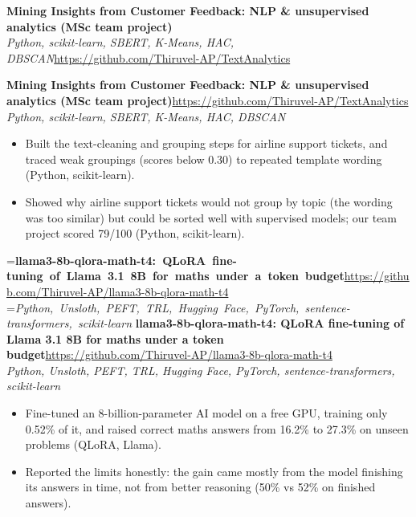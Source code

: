 \documentclass[a4paper,11pt]{article}
\newcommand{\project}[3]{%
  \textbf{#1}\hfill#3\\ {\color{muted}\small\textit{#2}}\par}
\newcommand{\gap}{\vspace{5pt}}
\begin{document}
\else
\textbf{Mining Insights from Customer Feedback: NLP \& unsupervised analytics (MSc team project)}\\ {\color{muted}\small\textit{Python, scikit-learn, SBERT, K-Means, HAC, DBSCAN}}\hfill{\small\url{https://github.com/Thiruvel-AP/TextAnalytics}}\par
\fi
\else
\project{Mining Insights from Customer Feedback: NLP \& unsupervised analytics (MSc team project)}{Python, scikit-learn, SBERT, K-Means, HAC, DBSCAN}{\url{https://github.com/Thiruvel-AP/TextAnalytics}}
\fi
\begin{itemize}
  \item Built the text-cleaning and grouping steps for airline support tickets, and traced weak groupings (scores below 0.30) to repeated template wording (Python, scikit-learn).
  \item Showed why airline support tickets would not group by topic (the wording was too similar) but could be sorted well with supervised models; our team project scored 79/100 (Python, scikit-learn).
\end{itemize}
\gap
{}
=\hbox{\textbf{llama3-8b-qlora-math-t4: QLoRA fine-tuning of Llama 3.1 8B for maths under a token budget}\hspace{1em}\url{https://github.com/Thiruvel-AP/llama3-8b-qlora-math-t4}}%
=\hbox{{\small\textit{Python, Unsloth, PEFT, TRL, Hugging Face, PyTorch, sentence-transformers, scikit-learn}}}%
\ifdim\wd0>\linewidth
\ifdim\wd2>\linewidth
\textbf{llama3-8b-qlora-math-t4: QLoRA fine-tuning of Llama 3.1 8B for maths under a token budget}\\ {\color{muted}\small\textit{Python, Unsloth, PEFT, TRL, Hugging Face, PyTorch, sentence-transformers, scikit-learn}}\\ \hspace*{\fill}{\small\url{https://github.com/Thiruvel-AP/llama3-8b-qlora-math-t4}}\par
\else
\textbf{llama3-8b-qlora-math-t4: QLoRA fine-tuning of Llama 3.1 8B for maths under a token budget}\\ {\color{muted}\small\textit{Python, Unsloth, PEFT, TRL, Hugging Face, PyTorch, sentence-transformers, scikit-learn}}\hfill{\small\url{https://github.com/Thiruvel-AP/llama3-8b-qlora-math-t4}}\par
\fi
\else
\project{llama3-8b-qlora-math-t4: QLoRA fine-tuning of Llama 3.1 8B for maths under a token budget}{Python, Unsloth, PEFT, TRL, Hugging Face, PyTorch, sentence-transformers, scikit-learn}{\url{https://github.com/Thiruvel-AP/llama3-8b-qlora-math-t4}}
\fi
\begin{itemize}
  \item Fine-tuned an 8-billion-parameter AI model on a free GPU, training only 0.52\% of it, and raised correct maths answers from 16.2\% to 27.3\% on unseen problems (QLoRA, Llama).
  \item Reported the limits honestly: the gain came mostly from the model finishing its answers in time, not from better reasoning (50\% vs 52\% on finished answers).
\end{itemize}
\end{document}
